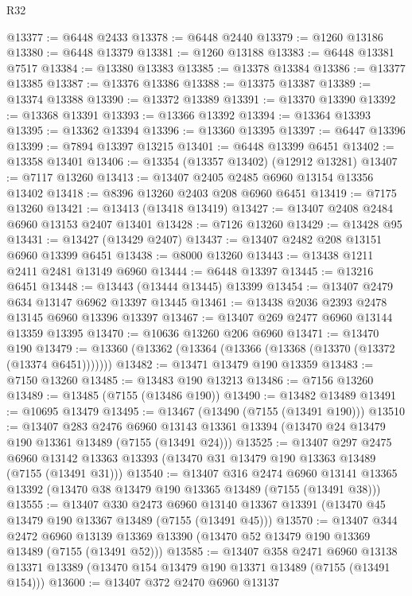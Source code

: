 \begin{lexlean}{R32}
\begin{coremodule}
@13377 := @6448 @2433
@13378 := @6448 @2440
@13379 := @1260 @13186
@13380 := @6448 @13379
@13381 := @1260 @13188
@13383 := @6448 @13381 @7517
@13384 := @13380 @13383
@13385 := @13378 @13384
@13386 := @13377 @13385
@13387 := @13376 @13386
@13388 := @13375 @13387
@13389 := @13374 @13388
@13390 := @13372 @13389
@13391 := @13370 @13390
@13392 := @13368 @13391
@13393 := @13366 @13392
@13394 := @13364 @13393
@13395 := @13362 @13394
@13396 := @13360 @13395
@13397 := @6447 @13396
@13399 := @7894 @13397 @13215
@13401 := @6448 @13399 @6451
@13402 := @13358 @13401
@13406 := @13354 (@13357 @13402) (@12912 @13281)
@13407 := @7117 @13260
@13413 := @13407 @2405 @2485 @6960 @13154 @13356 @13402
@13418 := @8396 @13260 @2403 @208 @6960 @6451
@13419 := @7175 @13260
@13421 := @13413 (@13418 @13419)
@13427 := @13407 @2408 @2484 @6960 @13153 @2407 @13401
@13428 := @7126 @13260
@13429 := @13428 @95
@13431 := @13427 (@13429 @2407)
@13437 := @13407 @2482 @208 @13151 @6960 @13399 @6451
@13438 := @8000 @13260
@13443 := @13438 @1211 @2411 @2481 @13149 @6960
@13444 := @6448 @13397
@13445 := @13216 @6451
@13448 := @13443 (@13444 @13445) @13399
@13454 := @13407 @2479 @634 @13147 @6962 @13397 @13445
@13461 := @13438 @2036 @2393 @2478 @13145 @6960 @13396 @13397
@13467 := @13407 @269 @2477 @6960 @13144 @13359 @13395
@13470 := @10636 @13260 @206 @6960
@13471 := @13470 @190
@13479 := @13360 (@13362 (@13364 (@13366 (@13368 (@13370 (@13372 (@13374 @6451)))))))
@13482 := @13471 @13479 @190 @13359
@13483 := @7150 @13260
@13485 := @13483 @190 @13213
@13486 := @7156 @13260
@13489 := @13485 (@7155 (@13486 @190))
@13490 := @13482 @13489
@13491 := @10695 @13479
@13495 := @13467 (@13490 (@7155 (@13491 @190)))
@13510 := @13407
    @283
    @2476
    @6960
    @13143
    @13361
    @13394
    (@13470 @24 @13479 @190 @13361 @13489 (@7155 (@13491 @24)))
@13525 := @13407
    @297
    @2475
    @6960
    @13142
    @13363
    @13393
    (@13470 @31 @13479 @190 @13363 @13489 (@7155 (@13491 @31)))
@13540 := @13407
    @316
    @2474
    @6960
    @13141
    @13365
    @13392
    (@13470 @38 @13479 @190 @13365 @13489 (@7155 (@13491 @38)))
@13555 := @13407
    @330
    @2473
    @6960
    @13140
    @13367
    @13391
    (@13470 @45 @13479 @190 @13367 @13489 (@7155 (@13491 @45)))
@13570 := @13407
    @344
    @2472
    @6960
    @13139
    @13369
    @13390
    (@13470 @52 @13479 @190 @13369 @13489 (@7155 (@13491 @52)))
@13585 := @13407
    @358
    @2471
    @6960
    @13138
    @13371
    @13389
    (@13470 @154 @13479 @190 @13371 @13489 (@7155 (@13491 @154)))
@13600 := @13407
    @372
    @2470
    @6960
    @13137

\end{coremodule}
\end{lexlean}
